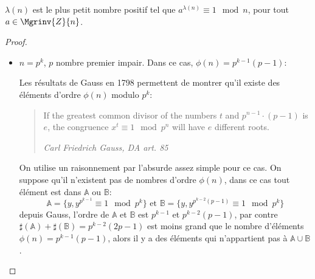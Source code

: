 \begin{theorem}{$\lambda(n)$ est le plus petit nombre positif tel que $a^{\lambda(n)} \equiv 1 \mod{n}$, pour tout $a\in \Mgrinv{Z}{n}$.}
\begin{proof}
\begin{itemize}
						$2^{k-2}$ est le plus petit, parce que pour $a=5$, $5^{2^{k-3}}\not\equiv 1\mod{2^k}$:
						
						\begin{align*}
							5^{2^{k-3}}&=(1+2^2)^{2^{k-3}} \\ 
								   &= 1+2^{k-1}+A\cdot 2^k{k}, A\in\mathbb{Z} \\
								   &\equiv 1+2^{k-1} \mod{2^{k}}
						\end{align*}



					\item $n = p^k$, $p$ nombre premier impair. Dans ce cas, $\phi(n) = p^{k-1}(p-1)$:

						Les résultats de Gauss en 1798 permettent de montrer qu'il existe des éléments d'ordre $\phi(n)$ modulo $p^k$:
						\begin{quotation}
							If the greatest common divisor of the numbers $t$ and 
							$p^{n-1}\cdot(p-1)$ is $e$, the congruence $x^t\equiv 1\mod p^n$
							will have $e$ different roots.
		
							\hfill \em Carl Friedrich Gauss, DA art. 85\cite{gauss1966disquisitiones}
						\end{quotation}	
						On utilise un raisonnement par l'absurde assez simple pour ce cas. On suppose qu'il n'existent pas 
						de nombres d'ordre $\phi(n)$, dans ce cas tout élément est dans $\mathbb{A}$ ou $\mathbb{B}$:
						$$ \mathbb{A} = \{y, y^{p^{k-1}}\equiv 1 \mod{p^k}\} \text{ et } \mathbb{B} = \{y, y^{p^{k-2}(p-1)}\equiv 1 \mod{p^k}\} $$
						depuis Gauss, l'ordre de $\mathbb{A}$ et $\mathbb{B}$ est $p^{k-1}$ et $p^{k-2}(p-1)$, par contre
						$\sharp (\mathbb{A}) + \sharp (\mathbb{B}) = p^{k-2}(2p-1)$ est moins grand que le nombre 
						d'éléments $\phi(n) = p^{k-1}(p-1)$, alors il y a des éléments qui n'appartient pas à $\mathbb{A} \cup \mathbb{B}$.
				\end{itemize}
			\end{proof}
		\end{theorem}
